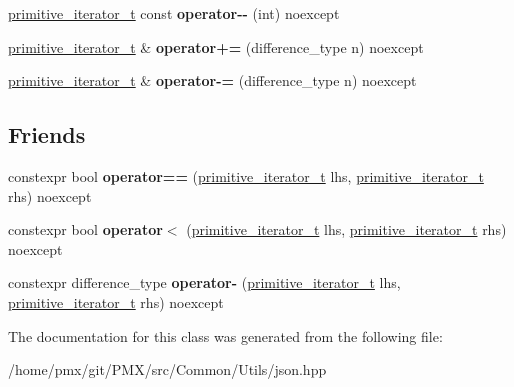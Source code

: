 \begin{DoxyCompactItemize}
\hyperlink{classnlohmann_1_1detail_1_1primitive__iterator__t}{primitive\+\_\+iterator\+\_\+t} const {\bfseries operator-\/-\/} (int) noexcept
\item 
\mbox{\label{classnlohmann_1_1detail_1_1primitive__iterator__t_aee01535df0b3b40137d9241029a9a203}} 
\hyperlink{classnlohmann_1_1detail_1_1primitive__iterator__t}{primitive\+\_\+iterator\+\_\+t} \& {\bfseries operator+=} (difference\+\_\+type n) noexcept
\item 
\mbox{\label{classnlohmann_1_1detail_1_1primitive__iterator__t_a0bf83ab08abe1ae4b51c790c85cdf151}} 
\hyperlink{classnlohmann_1_1detail_1_1primitive__iterator__t}{primitive\+\_\+iterator\+\_\+t} \& {\bfseries operator-\/=} (difference\+\_\+type n) noexcept
\end{DoxyCompactItemize}
\subsection*{Friends}
\begin{DoxyCompactItemize}
\item 
\mbox{\label{classnlohmann_1_1detail_1_1primitive__iterator__t_aae1e1e2ec0e229d1291d69de57d76bbe}} 
constexpr bool {\bfseries operator==} (\hyperlink{classnlohmann_1_1detail_1_1primitive__iterator__t}{primitive\+\_\+iterator\+\_\+t} lhs, \hyperlink{classnlohmann_1_1detail_1_1primitive__iterator__t}{primitive\+\_\+iterator\+\_\+t} rhs) noexcept
\item 
\mbox{\label{classnlohmann_1_1detail_1_1primitive__iterator__t_a901a95e6d73c9509d3dcde914f6c8a9d}} 
constexpr bool {\bfseries operator$<$} (\hyperlink{classnlohmann_1_1detail_1_1primitive__iterator__t}{primitive\+\_\+iterator\+\_\+t} lhs, \hyperlink{classnlohmann_1_1detail_1_1primitive__iterator__t}{primitive\+\_\+iterator\+\_\+t} rhs) noexcept
\item 
\mbox{\label{classnlohmann_1_1detail_1_1primitive__iterator__t_ac6d902d6ec9a02dabed5452d3ae78f7e}} 
constexpr difference\+\_\+type {\bfseries operator-\/} (\hyperlink{classnlohmann_1_1detail_1_1primitive__iterator__t}{primitive\+\_\+iterator\+\_\+t} lhs, \hyperlink{classnlohmann_1_1detail_1_1primitive__iterator__t}{primitive\+\_\+iterator\+\_\+t} rhs) noexcept
\end{DoxyCompactItemize}


The documentation for this class was generated from the following file\+:\begin{DoxyCompactItemize}
\item 
/home/pmx/git/\+P\+M\+X/src/\+Common/\+Utils/json.\+hpp\end{DoxyCompactItemize}
